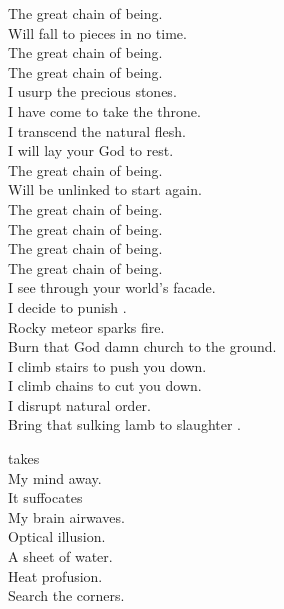 The great chain of being. \\
Will fall to pieces in no time. \\

The great chain of being. \\
The great chain of being. \\

I usurp the precious stones. \\
I have come to take the throne. \\
I transcend the natural flesh. \\
I will lay your God to rest. \\

The great chain of being. \\
Will be unlinked to start again. \\

The great chain of being. \\
The great chain of being. \\
The great chain of being. \\
The great chain of being. \\

I see through your world's facade. \\
I decide to punish . \\
Rocky meteor sparks fire. \\
Burn that God damn church to the ground. \\

I climb stairs to push you down. \\
I climb chains to cut you down. \\
I disrupt natural order. \\
Bring that sulking lamb to slaughter . \\




 takes \\
My mind away. \\
It suffocates \\
My brain airwaves. \\

Optical illusion. \\
A sheet of water. \\
Heat profusion. \\
Search the corners. \\

